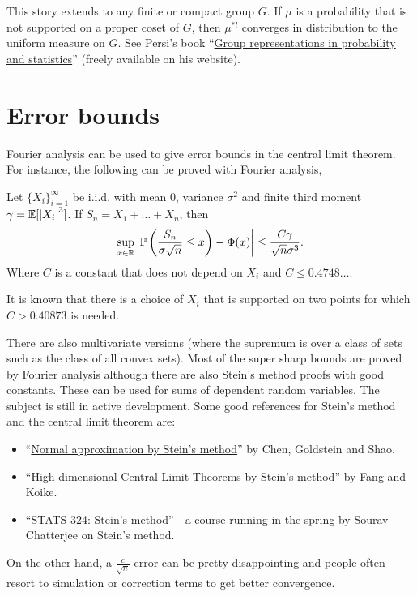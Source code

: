 This story extends to any finite or compact group $G$. If $\mu$ is a probability that is not supported on a proper coset of $G$, then $\mu^{*l}$ converges in distribution to the uniform measure on $G$. See Persi's book ``\href{https://projecteuclid.org/ebooks/institute-of-mathematical-statistics-lecture-notes-monograph-series/Group-representations-in-probability-and-statistics/toc/10.1214/lnms/1215467407#toc}{Group representations in probability and statistics}'' (freely available on his website).
\section{Error bounds}
Fourier analysis can be used to give error bounds in the central limit theorem. For instance, the following can be proved with Fourier analysis,
\begin{thrm}
    Let $\{X_i\}_{i=1}^\infty$ be i.i.d. with mean 0, variance $\sigma^2$ and finite third moment $\gamma = {\mathbb{E}}[{\left\lvert X_i\right\rvert}^3]$. If $S_n=X_1+\ldots+X_n$, then
    \[\sup_{x \in {\mathbb R}}{\left\lvert{\mathbb{P}}\left(\frac{S_n}{\sigma\sqrt{n}}\le x\right)-\Phi(x)\right\rvert} \le \frac{C \gamma}{\sqrt{n}\sigma^3}. \]
    Where $C$ is a constant that does not depend on $X_i$ and $C \le 0.4748\ldots$.
\end{thrm}
It is known that there is a choice of $X_i$ that is supported on two points for which $C > 0.40873$ is needed. 

There are also multivariate versions (where the supremum is over a class of sets such as the class of all convex sets). Most of the super sharp bounds are proved by Fourier analysis although there are also Stein's method proofs with good constants. These can be used for sums of dependent random variables. The subject is still in active development. Some good references for Stein's method and the central limit theorem are:
\begin{itemize}
    \item ``\href{https://searchworks.stanford.edu/view/9115286}{Normal approximation by Stein's method}'' by Chen, Goldstein and Shao.
    \item ``\href{https://arxiv.org/abs/2001.10917}{High-dimensional Central Limit Theorems by Stein's method}'' by Fang and Koike.
    \item ``\href{https://explorecourses.stanford.edu/search?view=catalog&filter-coursestatus-Active=on&page=0&catalog=&academicYear=&q=STATS+324%3A+Stein%27s+Method&collapse=}{STATS 324: Stein's method}'' - a course running in the spring by Sourav Chatterjee on Stein's method.
\end{itemize}
On the other hand, a $\frac{c}{\sqrt{n}}$ error can be pretty disappointing and people often resort to simulation or correction terms to get better convergence.
